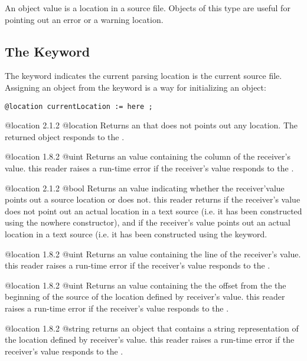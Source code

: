 

An  object value is a location in a source file. Objects of this type are useful for pointing out an error or a warning location.

\subsection{The  Keyword}

The  keyword indicates the current parsing location is the current source file. Assigning an  object from the  keyword is a way for initializing an  object:\newline

\texttt{@location currentLocation := here ;}

{@location}
{2.1.2}
{@location}
{Returns an  that does not points out any location.}
{The returned object responds  to the .}


{@location}
{1.8.2}
{@uint}
{Returns an  value containing the column of the receiver's value.}
{this reader raises a run-time error if the receiver's value responds  to the .}


{@location}
{2.1.2}
{@bool}
{Returns an  value indicating whether the receiver'value points out a source location or does not.}
{this reader returns  if the receiver's value does not point out an actual location in a text source (i.e. it has been constructed using the nowhere constructor), and  if the receiver's value points out an actual location in a text source (i.e. it has been constructed using the  keyword.}


{@location}
{1.8.2}
{@uint}
{Returns an  value containing the line of the receiver's value.}
{this reader raises a run-time error if the receiver's value responds  to the .}


{@location}
{1.8.2}
{@uint}
{Returns an  value containing the the offset from the the beginning of the source of the location defined by receiver's value.}
{this reader raises a run-time error if the receiver's value responds  to the .}


{@location}
{1.8.2}
{@string}
{returns an  object that contains a string representation of the location defined by receiver's value.}
{this reader raises a run-time error if the receiver's value responds  to the .}
